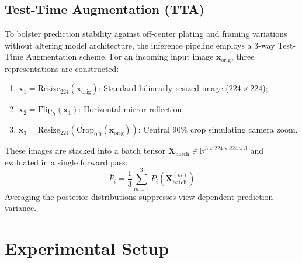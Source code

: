 \documentclass[conference]{IEEEtran}
\begin{document}
\subsection{Test-Time Augmentation (TTA)}
To bolster prediction stability against off-center plating and framing variations without altering model architecture, the inference pipeline employs a 3-way Test-Time Augmentation scheme. For an incoming input image $\mathbf{x}_{\text{orig}}$, three representations are constructed:
\begin{enumerate}
    \item $\mathbf{x}_1 = \text{Resize}_{224}(\mathbf{x}_{\text{orig}})$: Standard bilinearly resized image (${224 \times 224}$);
    \item $\mathbf{x}_2 = \text{Flip}_h(\mathbf{x}_1)$: Horizontal mirror reflection;
    \item $\mathbf{x}_3 = \text{Resize}_{224}(\text{Crop}_{0.9}(\mathbf{x}_{\text{orig}}))$: Central 90\% crop simulating camera zoom.
\end{enumerate}
These images are stacked into a batch tensor $\mathbf{X}_{\text{batch}} \in \mathbb{R}^{3 \times 224 \times 224 \times 3}$ and evaluated in a single forward pass:
\begin{equation}
\bar{P}_i = \frac{1}{3} \sum_{m=1}^{3} P_i(\mathbf{X}_{\text{batch}}^{(m)})
\end{equation}
Averaging the posterior distributions suppresses view-dependent prediction variance.

\section{Experimental Setup}
\end{document}
